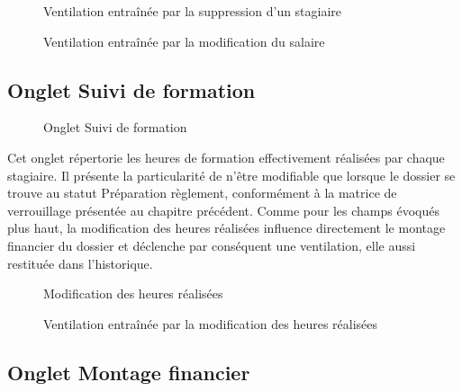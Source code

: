 \begin{figure}[H]
  \centering
  \caption{Ventilation entraînée par la suppression d'un stagiaire}
  \label{fig:vent-suppr-stagiaire}
\end{figure}

\begin{figure}[H]
  \centering
  \caption{Ventilation entraînée par la modification du salaire}
  \label{fig:vent-salaire}
\end{figure}

\subsection{Onglet Suivi de formation}

\begin{figure}[H]
  \centering
  \caption{Onglet Suivi de formation}
  \label{fig:onglet-suivi}
\end{figure}

Cet onglet répertorie les heures de formation effectivement réalisées
par chaque stagiaire. Il présente la particularité de n'être modifiable
que lorsque le dossier se trouve au statut \og{}Préparation
règlement\fg{}, conformément à la matrice de verrouillage présentée au
chapitre précédent. Comme pour les champs évoqués plus haut, la
modification des heures réalisées influence directement le montage
financier du dossier et déclenche par conséquent une ventilation, elle
aussi restituée dans l'historique.

\begin{figure}[H]
  \centering
  \caption{Modification des heures réalisées}
  \label{fig:modif-suivi}
\end{figure}

\begin{figure}[H]
  \centering
  \caption{Ventilation entraînée par la modification des heures réalisées}
  \label{fig:vent-suivi}
\end{figure}

\subsection{Onglet Montage financier}
\label{subsec:montage-financier}

